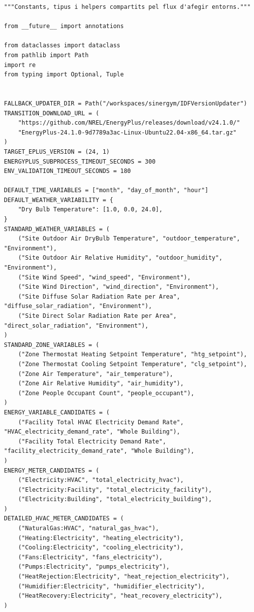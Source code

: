 \documentclass[10pt,a4paper]{article}
\begin{document}
\begin{lstlisting}[style=studioPython,caption={backend/afegir\_entorn\_common.py},label={lst:backend-afegir-entorn-common-py}]
"""Constants, tipus i helpers compartits pel flux d'afegir entorns."""

from __future__ import annotations

from dataclasses import dataclass
from pathlib import Path
import re
from typing import Optional, Tuple


FALLBACK_UPDATER_DIR = Path("/workspaces/sinergym/IDFVersionUpdater")
TRANSITION_DOWNLOAD_URL = (
    "https://github.com/NREL/EnergyPlus/releases/download/v24.1.0/"
    "EnergyPlus-24.1.0-9d7789a3ac-Linux-Ubuntu22.04-x86_64.tar.gz"
)
TARGET_EPLUS_VERSION = (24, 1)
ENERGYPLUS_SUBPROCESS_TIMEOUT_SECONDS = 300
ENV_VALIDATION_TIMEOUT_SECONDS = 180

DEFAULT_TIME_VARIABLES = ["month", "day_of_month", "hour"]
DEFAULT_WEATHER_VARIABILITY = {
    "Dry Bulb Temperature": [1.0, 0.0, 24.0],
}
STANDARD_WEATHER_VARIABLES = (
    ("Site Outdoor Air DryBulb Temperature", "outdoor_temperature", "Environment"),
    ("Site Outdoor Air Relative Humidity", "outdoor_humidity", "Environment"),
    ("Site Wind Speed", "wind_speed", "Environment"),
    ("Site Wind Direction", "wind_direction", "Environment"),
    ("Site Diffuse Solar Radiation Rate per Area", "diffuse_solar_radiation", "Environment"),
    ("Site Direct Solar Radiation Rate per Area", "direct_solar_radiation", "Environment"),
)
STANDARD_ZONE_VARIABLES = (
    ("Zone Thermostat Heating Setpoint Temperature", "htg_setpoint"),
    ("Zone Thermostat Cooling Setpoint Temperature", "clg_setpoint"),
    ("Zone Air Temperature", "air_temperature"),
    ("Zone Air Relative Humidity", "air_humidity"),
    ("Zone People Occupant Count", "people_occupant"),
)
ENERGY_VARIABLE_CANDIDATES = (
    ("Facility Total HVAC Electricity Demand Rate", "HVAC_electricity_demand_rate", "Whole Building"),
    ("Facility Total Electricity Demand Rate", "facility_electricity_demand_rate", "Whole Building"),
)
ENERGY_METER_CANDIDATES = (
    ("Electricity:HVAC", "total_electricity_hvac"),
    ("Electricity:Facility", "total_electricity_facility"),
    ("Electricity:Building", "total_electricity_building"),
)
DETAILED_HVAC_METER_CANDIDATES = (
    ("NaturalGas:HVAC", "natural_gas_hvac"),
    ("Heating:Electricity", "heating_electricity"),
    ("Cooling:Electricity", "cooling_electricity"),
    ("Fans:Electricity", "fans_electricity"),
    ("Pumps:Electricity", "pumps_electricity"),
    ("HeatRejection:Electricity", "heat_rejection_electricity"),
    ("Humidifier:Electricity", "humidifier_electricity"),
    ("HeatRecovery:Electricity", "heat_recovery_electricity"),
)



\end{lstlisting}
\end{document}

